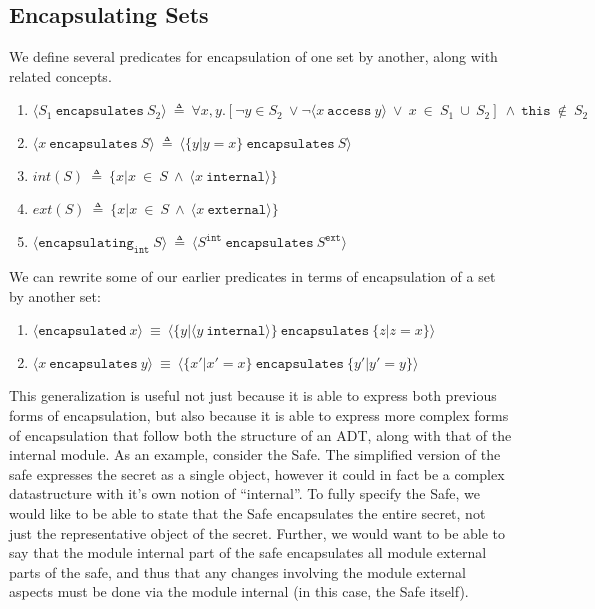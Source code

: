 \documentclass[12pt]{article}
\newcommand\encapsulated[1]{\langle \texttt{encapsulated}\ #1 \rangle}
\newcommand\encapsulates[2]{\langle #1\ \texttt{encapsulates}\ #2 \rangle}
\newcommand\encapsulatesMdl[1]{\langle \texttt{encapsulating}_\texttt{int}\ #1 \rangle}
\newcommand\access[2]{\langle #1\ \texttt{access}\ #2 \rangle}
\newcommand\internal[1]{\langle #1\ \texttt{internal}\rangle}
\newcommand\external[1]{\langle #1\ \texttt{external}\rangle}
\newcommand\comprehension[2]{\{#1 | #2\}}
\numberwithin{case}{lemma}
\numberwithin{case}{theorem}
\numberwithin{subcase}{case}
\begin{document}
{\color{Green}
\subsection{Encapsulating Sets}
We define several predicates for encapsulation of one set by another, along with related concepts.
\begin{enumerate}
\item
$\langle S_1\ \texttt{encapsulates}\ S_2 \rangle\ \triangleq\ \forall x, y.[\neg y \in S_2\ \vee \neg \access{x}{y}\ \vee\ x\ \in\ S_1\ \cup\ S_2]\ \wedge\ \texttt{this}\ \not\in\ S_2$
\item
$\encapsulates{x}{S}\ \triangleq\ \encapsulates{\comprehension{y}{y = x}}{S} $
\item
$\textit{int}(S)\ \triangleq\ \comprehension{x}{x\ \in\ S\ \wedge\ \internal{x}}$
\item
$\textit{ext}(S)\ \triangleq\ \comprehension{x}{x\ \in\ S\ \wedge\ \external{x}}$
\item
$\encapsulatesMdl{S}\ \triangleq\ \encapsulates{S^\texttt{int}}{S^\texttt{ext}}$
\end{enumerate}

We can rewrite some of our earlier predicates in terms of encapsulation of a set by another set:
\begin{enumerate}
\item
$\encapsulated{x}\ \equiv\ \encapsulates{\comprehension{y}{\internal{y}}}{\comprehension{z}{z = x}}$
\item
$\encapsulates{x}{y}\ \equiv\ \encapsulates{\comprehension{x'}{x' = x}}{\comprehension{y'}{y' = y}}$
\end{enumerate}
This generalization is useful not just because it is able to express both previous forms of 
encapsulation, but also because it is able to express more complex forms of encapsulation
that follow both the structure of an ADT, along with that of the internal module. As an example,
consider the Safe. The simplified version of the safe expresses the secret as a single object, 
however it could in fact be a complex datastructure with it's own notion of ``internal''. To 
fully specify the Safe, we would like to be able to state that the Safe encapsulates the entire
secret, not just the representative object of the secret. Further, we would want to be able to 
say that the module internal part of the safe encapsulates all module external parts of the safe,
and thus that any changes involving the module external aspects must be done via the module internal
(in this case, the Safe itself).
}
\end{document}
